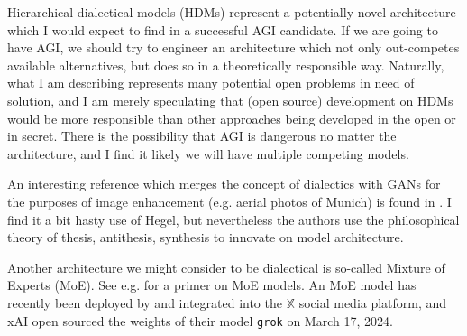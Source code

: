 \documentclass[11pt, oneside]{article}   	%
\begin{document}
Hierarchical dialectical models (HDMs) represent a potentially novel architecture which I would expect to find in a successful AGI candidate.  If we are going to have AGI, we should try to engineer an architecture which not only out-competes available alternatives, but does so in a theoretically responsible way.  Naturally, what I am describing represents many potential open problems in need of solution, and I am merely speculating that (open source) development on HDMs would be more responsible than other approaches being developed in the open or in secret.  There is the possibility that AGI is dangerous no matter the architecture, and I find it likely we will have multiple competing models.

An interesting reference which merges the concept of dialectics with GANs for the purposes of image enhancement (e.g. aerial photos of Munich) is found in \citep{DialecticalGANS2018}.  I find it a bit hasty use of Hegel, but nevertheless the authors use the philosophical theory of thesis, antithesis, synthesis to innovate on model architecture.


Another architecture we might consider to be dialectical is so-called Mixture of Experts (MoE).  See e.g. \citep{HFMOE} for a primer on MoE models.  An MoE model has recently been deployed by and integrated into the $\mathbb{X}$ social media platform, and xAI open sourced the weights of their model \texttt{grok} on March 17, 2024.  





\end{document}
